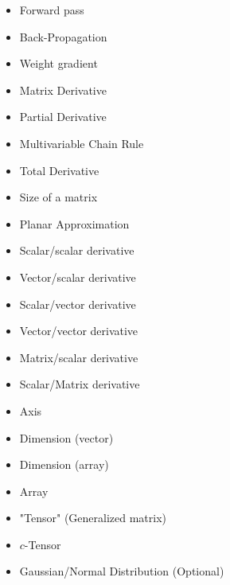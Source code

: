     \begin{itemize}
        \item Forward pass
        \item Back-Propagation
        \item Weight gradient
        \item Matrix Derivative
        \item Partial Derivative
        \item Multivariable Chain Rule
        \item Total Derivative
        \item Size of a matrix
        \item Planar Approximation
        \item Scalar/scalar derivative
        \item Vector/scalar derivative
        \item Scalar/vector derivative
        \item Vector/vector derivative
        \item Matrix/scalar derivative
        \item Scalar/Matrix derivative
        \item Axis
        \item Dimension (vector)
        \item Dimension (array)
        \item Array
        \item "Tensor" (Generalized matrix)
        \item $c$-Tensor
        \item Gaussian/Normal Distribution (Optional)
    \end{itemize}